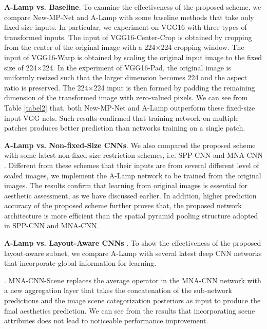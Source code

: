 \documentclass[10pt,twocolumn,letterpaper]{article}
\begin{document}
\textbf{A-Lamp vs. Baseline}.
To examine the effectiveness of the proposed scheme, we compare New-MP-Net and A-Lamp with some baseline methods that take only fixed-size inputs. In particular, we experiment on VGG16 with three types of transformed inputs.
The input of VGG16-Center-Crop is obtained by cropping  from the center of the original image with a 224$\times$224 cropping window. The input of VGG16-Warp is obtained by scaling the original input image to the fixed size of 224$\times$224. In the experiment of VGG16-Pad, the original image is uniformly resized such that the larger dimension becomes 224 and the aspect ratio is preserved. The 224$\times$224 input is then formed by padding the remaining dimension of the transformed image with zero-valued pixels.
We can see from Table \ref{tabel2} that, both New-MP-Net and A-Lamp outperform these fixed-size input VGG nets. Such results confirmed that training network on multiple patches produces better prediction than networks training on a single patch.

\textbf{A-Lamp vs. Non-fixed-Size CNNs}.
We also compared the proposed scheme with some latest non-fixed size restriction schemes, i.e. SPP-CNN \cite{He:archive:2014} and MNA-CNN \cite{Mai:2016:CVPR}. Different from these schemes that their inputs are from several different level of scaled images, we implement the A-Lamp network to be trained from the original images. The results confirm that learning from original images is essential for aesthetic assessment, as we have discussed earlier. In addition, higher prediction accuracy of the proposed scheme further proves that, the proposed network architecture is more efficient than the spatial pyramid pooling structure adopted in SPP-CNN and MNA-CNN.

\textbf{A-Lamp vs. Layout-Aware CNNs }. To show the effectiveness of the proposed layout-aware subnet, we compare A-Lamp with several latest deep CNN networks that incorporate global information for learning.

. MNA-CNN-Scene \cite{Mai:2016:CVPR} replaces the average operator in the MNA-CNN network with a new aggregation layer that takes the concatenation of the sub-network predictions and the image scene categorization posteriors as input to produce the final aesthetics prediction. We can see from the results that incorporating scene attributes does not lead to noticeable performance improvement.
\end{document}
